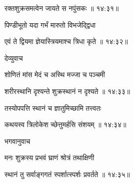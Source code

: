 
{\devanagarifont रक्तशुक्रसमत्वेन जायते स नपुंसकः {॥ १४:३१॥} \veg\dontdisplaylinenum }%
 
{\devanagarifont पिण्डीभूतो यदा गर्भं मारुतो विभजेद्द्विधा \thinspace{\dandab} \dontdisplaylinenum }%


{\devanagarifont एवं ते द्वियमा ज्ञेयास्त्रियमाश्च त्रिधा कृते {॥ १४:३२॥} \veg\dontdisplaylinenum }%

{\devanagarifont देव्युवाच {\dandab}\dontdisplaylinenum  }%
 
{\devanagarifont शोणितं मांस मेदं च अस्थि मज्जा च पञ्चमी \thinspace{\danda} \dontdisplaylinenum }%


{\devanagarifont शरीरस्थानि दृश्यन्ते शुक्रस्थानं न दृश्यते {॥ १४:३३॥} \veg\dontdisplaylinenum }%

{\devanagarifont तस्योपपत्ति स्थानं च ज्ञातुमिच्छामि तत्त्वतः \thinspace{\dandab} \dontdisplaylinenum }%


{\devanagarifont कथयस्व त्रिलोकेश च्छेत्तुमर्हसि संशयम् {॥ १४:३४॥} \veg\dontdisplaylinenum }%

{\devanagarifont भगवानुवाच {\dandab}\dontdisplaylinenum  }%
 
{\devanagarifont मनः शुक्रस्य प्रभवं घ्राणं श्रोत्रं तथाक्षिणी \thinspace{\danda} \dontdisplaylinenum }%


{\devanagarifont स्थानं तु सर्वाङ्गगतं स्पर्शात्स्पर्शः प्रवर्तते {॥ १४:३५॥} \veg\dontdisplaylinenum }%

